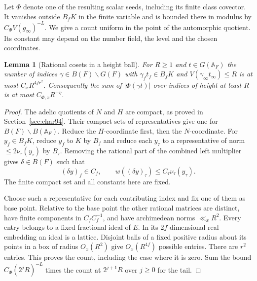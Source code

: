 \documentclass[a4paper,11pt]{article}
\newtheorem{lemma}[proposition]{Lemma}
\theoremstyle{definition}
\theoremstyle{remark}
\numberwithin{equation}{section}
\begin{document}
Let \(\Phi\) denote one of the resulting scalar seeds, including
its finite class covector. It vanishes outside \(B_fK\) in the
finite variable and is bounded there in modulus by \(C_\Phi
V(g_\infty)^{-L}\). We give a count uniform in the point of the
automorphic quotient. Its constant may depend on the number field,
the level and the chosen coordinates.

\begin{lemma}[Rational cosets in a height ball]\label{lem:cosets163}
For \(R\ge1\) and \(t\in G(\mathbb A_F)\) the number of indices
\(\gamma\in B(F)\backslash G(F)\) with \(\gamma_f t_f\in B_fK\)
and \(V(\gamma_\infty t_\infty)\le R\) is at most \(C_xR^{4fr^2}\).
Consequently the sum of \(|\Phi(\gamma t)|\) over indices of
height at least \(R\) is at most \(C_{\Phi,x}R^{-\eta}\).
\end{lemma}
\begin{proof}
The adelic quotients of \(N\) and \(H\) are compact, as proved
in Section~\ref{sec:char94}. Their compact sets of representatives
give one for \(B(F)\backslash B(\mathbb A_F)\). Reduce the
\(H\)-coordinate first, then the \(N\)-coordinate. For \(y_f\in
B_fK\), reduce \(y_f\) to \(K\) by \(B_f\) and reduce each
\(y_\tau\) to a representative of norm \(\le2\nu_\tau(y_\tau)\)
by \(B_\tau\). Removing the rational part of the combined left
multiplier gives \(\delta\in B(F)\) such that
\begin{equation}
       (\delta y)_f\in C_f,\qquad
       w((\delta y)_\tau)\le C_\tau\nu_\tau(y_\tau).
       \label{eq:lifts163}
\end{equation}
The finite compact set and all constants here are fixed.

Choose such a representative for each contributing index and
fix one of them as base point. Relative to the base point the
other rational matrices are distinct, have finite components
in \(C_fC_f^{-1}\), and have archimedean norms \(\ll_x R^2\).
Every entry belongs to a fixed fractional ideal of \(E\).
In its \(2f\)-dimensional real embedding an ideal is a lattice.
Disjoint balls of a fixed positive radius about its points in a
box of radius \(O_x(R^2)\) give \(O_x(R^{4f})\) possible entries.
There are \(r^2\) entries. This proves the count, including the
case where it is zero. Sum the bound \(C_\Phi(2^j R)^{-L}\)
times the count at \(2^{j+1}R\) over \(j\ge0\) for the tail.
\end{proof}
\end{document}

